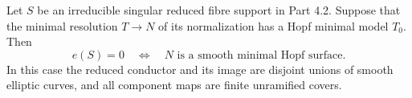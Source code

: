 
\begin{proposition}[P4.27]\hypertarget{tag-02WZ}{}\label{night:P4.27}\label{stmt:P4.27}


Let \(S\) be an irreducible singular reduced fibre support in Part 4.2.
Suppose that the minimal resolution \(T\to N\) of its normalization has a
Hopf minimal model \(T_0\). Then
\[
 e(S)=0\quad\Longleftrightarrow\quad
 N\text{ is a smooth minimal Hopf surface}.
\]
In this case the reduced conductor and its image are disjoint unions of
smooth elliptic curves, and all component maps are finite unramified covers.
\end{proposition}

